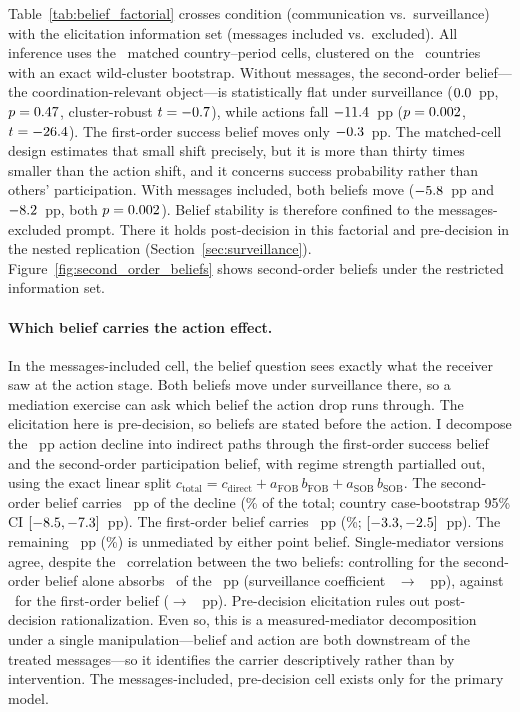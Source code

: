 \documentclass[12pt]{article}
\begin{document}
Table~\ref{tab:belief_factorial} crosses condition (communication vs.\ surveillance) with the elicitation information set (messages included vs.\ excluded). All inference uses the \BFNCells\ matched country--period cells, clustered on the \BFNClusters\ countries with an exact wild-cluster bootstrap. Without messages, the second-order belief---the coordination-relevant object---is statistically flat under surveillance ($0.0$~pp, $p = 0.47$, cluster-robust $t = -0.7$), while actions fall $-11.4$~pp ($p = 0.002$, $t = -26.4$). The first-order success belief moves only $-0.3$~pp. The matched-cell design estimates that small shift precisely, but it is more than thirty times smaller than the action shift, and it concerns success probability rather than others' participation. With messages included, both beliefs move ($-5.8$~pp and $-8.2$~pp, both $p = 0.002$). Belief stability is therefore confined to the messages-excluded prompt. There it holds post-decision in this factorial and pre-decision in the nested replication (Section~\ref{sec:surveillance}). Figure~\ref{fig:second_order_beliefs} shows second-order beliefs under the restricted information set.

\paragraph{Which belief carries the action effect.} In the messages-included cell, the belief question sees exactly what the receiver saw at the action stage. Both beliefs move under surveillance there, so a mediation exercise can ask which belief the action drop runs through. The elicitation here is pre-decision, so beliefs are stated before the action. I decompose the \BFMedTotalAbsPP~pp action decline into indirect paths through the first-order success belief and the second-order participation belief, with regime strength partialled out, using the exact linear split $c_{\text{total}} = c_{\text{direct}} + a_{\text{FOB}}\,b_{\text{FOB}} + a_{\text{SOB}}\,b_{\text{SOB}}$. The second-order belief carries \BFMedIndirectSOBPP~pp of the decline (\BFMedIndirectSOBShare\% of the total; country case-bootstrap 95\% CI $[-8.5, -7.3]$~pp). The first-order belief carries \BFMedIndirectFOBPP~pp (\BFMedIndirectFOBShare\%; $[-3.3, -2.5]$~pp). The remaining \BFMedDirectPP~pp (\BFMedDirectShare\%) is unmediated by either point belief. Single-mediator versions agree, despite the \BFMedBeliefCorr\ correlation between the two beliefs: controlling for the second-order belief alone absorbs \BFMedSOBAbsorbPP\ of the \BFMedTotalAbsPP~pp (surveillance coefficient \BFMedTotalPP\ $\to$ \BFMedSurvAfterSOBPP~pp), against \BFMedFOBAbsorbPP\ for the first-order belief ($\to$ \BFMedSurvAfterFOBPP~pp). Pre-decision elicitation rules out post-decision rationalization. Even so, this is a measured-mediator decomposition under a single manipulation---belief and action are both downstream of the treated messages---so it identifies the carrier descriptively rather than by intervention. The messages-included, pre-decision cell exists only for the primary model.
\end{document}
